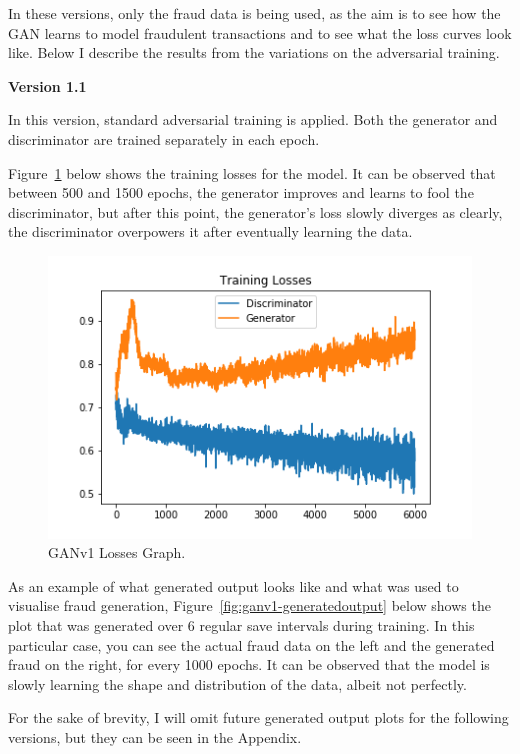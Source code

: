 \documentclass[12pt,a4paper,twoside]{report}
\begin{document}
In these versions, only the fraud data is being used, as the aim is to see how the GAN learns to model fraudulent transactions and to see what the loss curves look like. Below I describe the results from the variations on the adversarial training. 

\textbf{Version 1.1}

In this version, standard adversarial training is applied. Both the generator and discriminator are trained separately in each epoch.

Figure~\ref{fig:ganv1-losses} below shows the training losses for the model. It can be observed that between 500 and 1500 epochs, the generator improves and learns to fool the discriminator, but after this point, the generator's loss slowly diverges as clearly, the discriminator overpowers it after eventually learning the data.

\begin{figure}[!htbp]
\centering
\includegraphics[scale=0.6]{GANv1-losses}
\caption{GANv1 Losses Graph.}
\label{fig:ganv1-losses}
\end{figure}

As an example of what generated output looks like and what was used to visualise fraud generation, Figure~\ref{fig:ganv1-generatedoutput} below shows the plot that was generated over 6 regular save intervals during training. In this particular case, you can see the actual fraud data on the left and the generated fraud on the right, for every 1000 epochs. It can be observed that the model is slowly learning the shape and distribution of the data, albeit not perfectly. 

For the sake of brevity, I will omit future generated output plots for the following versions, but they can be seen in the Appendix. 
\end{document}
